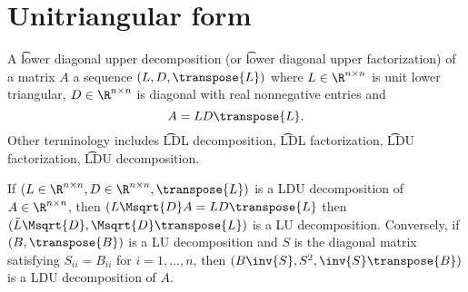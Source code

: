 \section*{Unitriangular form}

A \t{lower diagonal upper decomposition} (or \t{lower diagonal upper factorization}) of a matrix $A$ a sequence $(L, D, \transpose{L})$ where $L \in \R ^{n \times n}$ is unit lower triangular, $D \in \R ^{n \times n}$ is diagonal with real nonnegative entries and
    \[
A = LD\transpose{L}.
    \]
Other terminology includes \t{LDL decomposition}, \t{LDL factorization}, \t{LDU factorization}, \t{LDU decomposition}.

If $(L \in \R ^{n \times n}, D \in \R ^{n \times n}, \transpose{L})$ is a LDU decomposition of $A \in \R ^{n \times n}$, then $(L\Msqrt{D}A = LD\transpose{L}$ then $(\tilde{L}\Msqrt{D}, \Msqrt{D}\transpose{L})$ is a LU decomposition.
Conversely, if $(B, \transpose{B})$ is a LU decomposition and $S$ is the diagonal matrix satisfying $S_{ii} = B_{ii}$ for $i = 1, \dots , n$, then $(B\inv{S}, S^2, \inv{S}\transpose{B})$ is a LDU decomposition of $A$.

\blankpage